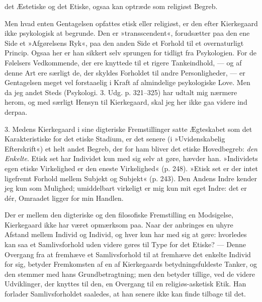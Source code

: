 \documentclass[12pt,a4paper,openany]{book}
\newcommand{\opage}[1]{\marginnote{\footnotesize\textit{[#1]}}}
\begin{document}
\opage{98}det Æstetiske og det Etiske, ogsaa kan optræde som
religiøst Begreb.

Men hvad enten Gentagelsen opfattes etisk eller religiøst,
er den efter Kierkegaard ikke psykologisk at begrunde.
Den er »transscendent«, forudsætter paa den ene
Side et »Afgørelsens Ryk«, paa den anden Side et Forhold
til et overnaturligt Princip. Ogsaa her er han sikkert
selv sprungen for tidligt fra Psykologien. For de
Følelsers Vedkommende, der ere knyttede til et rigere
Tankeindhold, --- og af denne Art ere særligt de, der
skyldes Forholdet til andre Personligheder, --- er Gentagelsen
meget vel forstaaelig i Kraft af almindelige psykologiske
Love. Men da jeg andet Steds (Psykologi. 3. Udg.
p. 321--325) har udtalt mig nærmere herom, og med
særligt Hensyn til Kierkegaard, skal jeg her ikke gaa
videre ind derpaa.

3. Medens Kierkegaard i sine digteriske Fremstillinger
satte Ægteskabet som det Karakteristiske for det
etiske Stadium, er det senere (i »Uvidenskabelig Efterskrift«)
et helt andet Begreb, der for ham bliver det
etiske Hovedbegreb: \textit{den Enkelte}. Etisk set har Individet
kun med sig selv at gøre, hævder han. »Individets egen
etiske Virkelighed er den eneste Virkelighed« (p. 248).
»Etisk set er der intet ligefremt Forhold mellem Subjekt og
Subjekt« (p. 243). Den Andens Indre kender jeg kun som
Mulighed; umiddelbart virkeligt er mig kun mit eget
Indre: det er dér, Omraadet ligger for min Handlen.

Der er mellem den digteriske og den filosofiske Fremstilling
en Modsigelse, Kierkegaard ikke har været opmærksom
paa. Naar der anbringes en uhyre Afstand
mellem Individ og Individ, og hver kun har med sig at
gøre: hvorledes kan saa et Samlivsforhold uden videre
gøres til Type for det Etiske? --- Denne Overgang fra
at fremhæve et Samlivsforhold til at fremhæve det enkelte
\opage{99}Individ for sig, betyder Fremkomsten af en af Kierkegaards
betydningsfuldeste Tanker, og den stemmer med
hans Grundbetragtning; men den betyder tillige, ved de
videre Udviklinger, der knyttes til den, en Overgang til
en religiøs-asketisk Etik. Han forlader Samlivsforholdet
saaledes, at han senere ikke kan finde tilbage til det.
\end{document}
